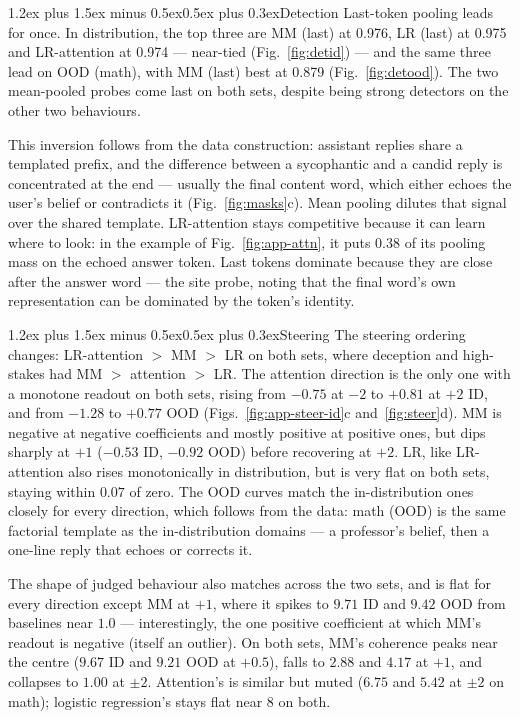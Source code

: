 \documentclass[conference]{IEEEtran}
\makeatletter
\renewcommand{\subsubsection}{\@startsection{subsubsection}{3}{1em}%
  {1.2ex plus 1.5ex minus 0.5ex}{0.5ex plus 0.3ex}{\normalfont\normalsize\itshape}}
\makeatother
\begin{document}
\subsubsection{Detection}
Last-token pooling leads for once. In distribution, the top three are
MM (last) at 0.976, LR (last) at 0.975 and LR-attention at 0.974 ---
near-tied (Fig.~\ref{fig:detid}) --- and the same three lead on OOD (math),
with MM (last) best at 0.879 (Fig.~\ref{fig:detood}). The two mean-pooled
probes come last on both sets, despite being strong detectors
on the other two behaviours.

This inversion follows from the data construction: assistant replies share a
templated prefix, and the difference between a sycophantic and a candid
reply is concentrated at the end --- usually the final content word, which
either echoes the user's belief or contradicts it (Fig.~\ref{fig:masks}c).
Mean pooling dilutes that signal over the shared template. LR-attention
stays competitive because it can learn where to look: in the example of
Fig.~\ref{fig:app-attn}, it puts 0.38 of its pooling mass on the echoed
answer token. Last tokens dominate because they are close after the answer word --- the site \citet{marks2024} probe,
noting that the final word's own representation can be dominated by the
token's identity.

\subsubsection{Steering}
The steering ordering changes: LR-attention $>$ MM $>$ LR on both sets, where
deception and high-stakes had MM $>$ attention $>$ LR. The attention
direction is the only one with a monotone readout on both sets, rising
from $-0.75$ at $-2$ to $+0.81$ at $+2$ ID, and from $-1.28$
to $+0.77$ OOD (Figs.~\ref{fig:app-steer-id}c and~\ref{fig:steer}d). MM is negative at negative
coefficients and mostly positive at positive ones, but dips sharply at
$+1$ ($-0.53$ ID, $-0.92$ OOD) before recovering at $+2$.
LR, like LR-attention also rises monotonically in
distribution, but is very flat on both sets, staying within $0.07$ of
zero. The
OOD curves match the in-distribution ones closely for every direction,
which follows from the data: math (OOD) is the same factorial template as the
in-distribution domains --- a professor's belief, then a one-line reply
that echoes or corrects it.

The shape of judged behaviour also matches across the two sets, and is
flat for every direction except MM at $+1$, where it spikes to
$9.71$ ID and $9.42$ OOD from baselines near $1.0$ ---
interestingly, the one positive coefficient at which MM's readout
is negative (itself an outlier). On both sets, MM's coherence peaks
near the centre ($9.67$ ID and $9.21$ OOD at $+0.5$), falls to $2.88$ and
$4.17$ at $+1$, and collapses to $1.00$ at $\pm 2$.
Attention's is similar but muted ($6.75$ and $5.42$ at $\pm 2$ on math);
logistic regression's stays flat near $8$ on both.
\end{document}
